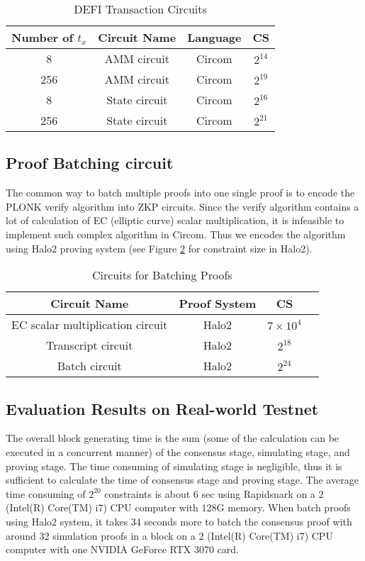 \begin{table}[h]
\small
\centering
\caption{DEFI Transaction Circuits}
\label{tbl:defi-cs}
\begin{tabular}{ | c | c | c | c | }
\hline
Number of $t_x$ & Circuit Name & Language & CS \\
\hline
8 & AMM circuit & Circom & $2^{14}$ \\
\hline
256 & AMM circuit & Circom & $2^{19}$ \\
\hline
8 & State circuit & Circom & $2^{16}$ \\
\hline
256 & State circuit & Circom & $2^{21}$ \\
\hline
\end{tabular}
\end{table}

\subsection{Proof Batching 
circuit}
The common way to batch multiple proofs into one single proof is to encode the PLONK verify algorithm into ZKP circuits. Since the verify algorithm contains a lot of calculation of EC (elliptic curve) scalar multiplication, it is infeasible to implement such complex algorithm in Circom. Thus we encodes the algorithm using Halo2 \cite{halo2book} proving system (see Figure \ref{tbl:batch-proofs} for constraint size in Halo2).  

\begin{table}[!ht]
\small
\centering
\caption{Circuits for Batching Proofs}
\label{tbl:batch-proofs}
\begin{tabular}{ | c | c | c | c | }
\hline
Circuit Name & Proof System & CS \\
\hline
EC scalar multiplication circuit & Halo2 & $7 \times 10^4$ \\
\hline
Transcript circuit & Halo2 & $2^{18}$ \\
\hline
Batch circuit & Halo2 & $2^{24}$ \\
\hline
\end{tabular}
\end{table}

\subsection{Evaluation Results on Real-world Testnet}
The overall block generating time is the sum (some of the calculation can be executed in a concurrent manner) of the consensus stage, simulating stage, and proving stage. The time consuming of simulating stage is negligible, thus it is sufficient to calculate the time of consensus stage and proving stage. The average time consuming of $2^{20}$ constraints is about 6 sec using Rapidsnark on a 2 (Intel(R) Core(TM) i7) CPU computer with 128G memory. When batch proofs using Halo2 system, it takes 34 seconds more to batch the consensus proof with around 32 simulation proofs in a block on a 2 (Intel(R) Core(TM) i7) CPU computer with one NVIDIA GeForce RTX 3070 card.

